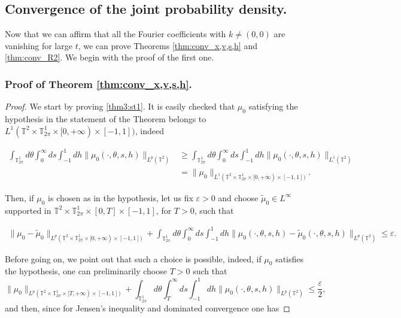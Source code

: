 \documentclass[a4paper,10pt,reqno]{amsart}
\numberwithin{equation}{subsection}
\numberwithin{figure}{subsection}
\begin{document}
\subsection{Convergence of the joint probability density.}
Now that we can affirm that all the Fourier coefficients with $k\neq(0,0)$ are vanishing for large $t$, we can prove Theorems \ref{thm:conv_x,v,s,h} and \ref{thm:conv_R2}. We begin with the proof of the first one.
\subsubsection{\textbf{Proof of Theorem \ref{thm:conv_x,v,s,h}.}}
\begin{proof} We start by proving \eqref{thm3:st1}. It is easily checked that $\mu_0$ satisfying the hypothesis in the statement of the Theorem belongs to $L^1(\mathbb{T}^2\times\mathbb{T}^1_{2\pi}\times[0,+\infty)\times[-1,1])$, indeed

{\small\begin{align*}
\int_{\mathbb{T}^1_{2\pi}}d\theta\int_0^{\infty}ds\int_{-1}^1dh\|\mu_0(\cdot,\theta,s,h)\|_{L^p(\mathbb{T}^2)}&\geq\int_{\mathbb{T}^1_{2\pi}}d\theta\int_0^{\infty}ds\int_{-1}^1dh\|\mu_0(\cdot,\theta,s,h)\|_{L^1(\mathbb{T}^2)}
\\
&=\|\mu_0\|_{L^1(\mathbb{T}^2\times\mathbb{T}^1_{2\pi}\times[0,+\infty)\times[-1,1])}.
\end{align*}}

Then, if $\mu_0$ is chosen as in the hypothesis, let us fix $\varepsilon>0$ and choose $\tilde\mu_0\in L^{\infty}$ supported in $\mathbb{T}^2\times\mathbb{T}^1_{2\pi}\times[0,T]\times[-1,1]$, for $T>0$,  such that

{\scriptsize\begin{align}\label{approssimazione}
\|\mu_0-\tilde\mu_0\|_{L^p(\mathbb{T}^2\times\mathbb{T}^1_{2\pi}\times[0,+\infty)\times[-1,1])}+\int_{\mathbb{T}^1_{2\pi}}d\theta\int_0^{\infty}ds\int_{-1}^1dh\|\mu_0(\cdot,\theta,s,h)-\tilde\mu_0(\cdot,\theta,s,h)\|_{L^p(\mathbb{T}^2)}\leq\varepsilon.
\end{align}}

Before going on, we point out that such a choice is possible, indeed, if $\mu_0$ satisfies the hypothesis, one can preliminarily choose $T>0$ such that
\[
\|\mu_0\|_{L^p(\mathbb{T}^2\times\mathbb{T}^1_{2\pi}\times[T,+\infty)\times[-1,1])}+\int_{\mathbb{T}^1_{2\pi}}d\theta\int_T^{\infty}ds\int_{-1}^1dh\|\mu_0(\cdot,\theta,s,h)\|_{L^p(\mathbb{T}^2)}\leq\frac{\varepsilon}{2},
\]
and then, since for Jensen's inequality and dominated convergence one has


\end{proof}
\end{document}
